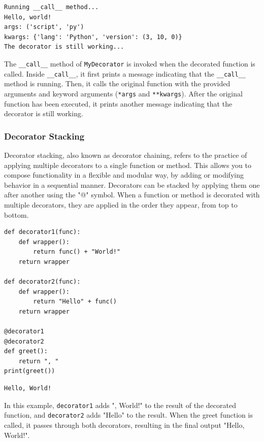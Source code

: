 \begin{verbatim}
Running __call__ method...
Hello, world!
args: ('script', 'py')
kwargs: {'lang': 'Python', 'version': (3, 10, 0)}
The decorator is still working...
\end{verbatim}

The \texttt{\_\_call\_\_} method of \texttt{MyDecorator} is invoked when the decorated function is called. Inside \texttt{\_\_call\_\_}, it first prints a message indicating that the \texttt{\_\_call\_\_} method is running. Then, it calls the original function with the provided arguments and keyword arguments (\texttt{*args} and \texttt{**kwargs}). After the original function has been executed, it prints another message indicating that the decorator is still working.\\

\newpage
\subsubsection{Decorator Stacking}
Decorator stacking, also known as decorator chaining, refers to the practice of applying multiple decorators to a single function or method. This allows you to compose functionality in a flexible and modular way, by adding or modifying behavior in a sequential manner. Decorators can be stacked by applying them one after another using the "@" symbol. When a function or method is decorated with multiple decorators, they are applied in the order they appear, from top to bottom.

\begin{codebox}
\begin{verbatim}
def decorator1(func):
    def wrapper():
        return func() + "World!"
    return wrapper

def decorator2(func):
    def wrapper():
        return "Hello" + func()
    return wrapper

@decorator1
@decorator2
def greet():
    return ", "
print(greet())
\end{verbatim}
\end{codebox}

\begin{verbatim}
Hello, World!
\end{verbatim}

In this example, \texttt{decorator1} adds ", World!" to the result of the decorated function, and \texttt{decorator2} adds "Hello" to the result. When the greet function is called, it passes through both decorators, resulting in the final output "Hello, World!".


